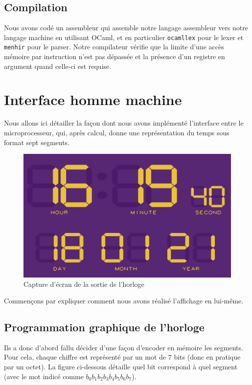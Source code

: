 \documentclass[10pt,a4paper,notitlepage ]{article}
\begin{document}
\subsection{Compilation}
	\par{Nous avons codé un assembleur qui assemble notre langage assembleur vers notre langage machine en utilisant OCaml, et en particulier \texttt{ocamllex} pour le lexer et \texttt{menhir} pour le parser. Notre compilateur vérifie que la limite d'une accès mémoire par instruction n'est pas dépassée et la présence d'un registre en argument quand celle-ci est requise.}


	\section{Interface homme machine}
	
	Nous allons ici détailler la façon dont nous avons implémenté l'interface entre le microprocesseur, qui, après calcul, donne une représentation du temps sous format sept segments.
	
	\begin{figure}[h]
		\centering
		\includegraphics[width=0.7\linewidth]{2021-01-18_16-19}
		\caption{Capture d'écran de la sortie de l'horloge}
		\label{fig:2021-01-1816-19}
	\end{figure}
	
	Commençons par expliquer comment nous avons réalisé l'affichage en lui-même.
	
	\subsection{Programmation graphique de l'horloge}
	
	Ils a donc d'abord fallu décider d'une façon d'encoder en mémoire les segments. Pour cela, chaque chiffre est représenté par un mot de $7$ bits (donc en pratique par un octet). La figure ci-dessous détaille quel bit correspond à quel segment (avec le mot indicé comme $b_0b_1b_2b_3b_4b_5b_6b_7$).
	
\end{document}
